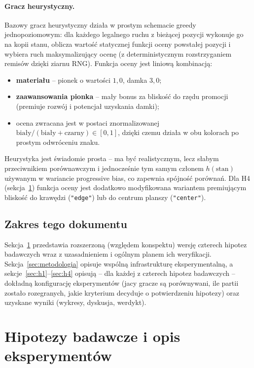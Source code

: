 \documentclass[11pt,a4paper]{article}
\begin{document}
\paragraph{Gracz heurystyczny.} Bazowy gracz heurystyczny działa w prostym
schemacie greedy jednopoziomowym: dla każdego legalnego ruchu z
bieżącej pozycji wykonuje go na kopii stanu, oblicza wartość statycznej
funkcji oceny powstałej pozycji i wybiera ruch maksymalizujący ocenę (z
deterministycznym rozstrzyganiem remisów dzięki ziarnu RNG). Funkcja oceny
jest liniową kombinacją:
\begin{itemize}[noitemsep]
    \item \textbf{materiału} -- pionek o wartości $1{,}0$, damka $3{,}0$;
    \item \textbf{zaawansowania pionka} -- mały bonus za bliskość do rzędu
        promocji (premiuje rozwój i potencjał uzyskania damki);
    \item ocena zwracana jest w postaci znormalizowanej
        $\text{biały}/(\text{biały}+\text{czarny}) \in [0,1]$, dzięki czemu
        działa w obu kolorach po prostym odwróceniu znaku.
\end{itemize}
Heurystyka jest świadomie prosta -- ma być realistycznym, lecz słabym
przeciwnikiem porównawczym i jednocześnie tym samym członem
$h(\text{stan})$ używanym w wariancie progressive bias, co zapewnia
spójność porównań. Dla H4 (sekcja~\ref{sec:hipotezy}) funkcja oceny jest
dodatkowo modyfikowana wariantem premiującym bliskość do krawędzi
(\texttt{"edge"}) lub do centrum planszy (\texttt{"center"}).

\subsection{Zakres tego dokumentu}

Sekcja~\ref{sec:hipotezy} przedstawia rozszerzoną (względem konspektu)
wersję czterech hipotez badawczych wraz z uzasadnieniem i ogólnym planem
ich weryfikacji. Sekcja~\ref{sec:metodologia} opisuje wspólną
infrastrukturę eksperymentalną, a sekcje~\ref{sec:h1}--\ref{sec:h4}
opisują -- dla każdej z czterech hipotez badawczych -- dokładną
konfigurację eksperymentów (jacy gracze są porównywani, ile partii
zostało rozegranych, jakie kryterium decyduje o potwierdzeniu hipotezy)
oraz uzyskane wyniki (wykresy, dyskusja, werdykt).

\section{Hipotezy badawcze i opis eksperymentów}
\label{sec:hipotezy}
\end{document}
